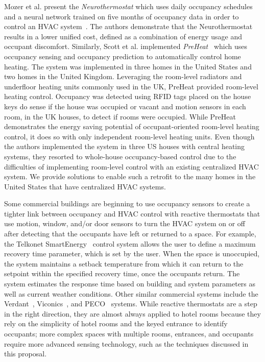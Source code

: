 Mozer et al. present the {\em Neurothermostat} which uses daily occupancy
schedules and a neural network trained on five months of occupancy data in order
to control an HVAC system~\cite{mozer1997neurothermostat}. The authors
demonstrate that the Neurothermostat results in a lower unified cost, defined as
a combination of energy usage and occupant discomfort. Similarly, Scott et
al. implemented {\em PreHeat}~\cite{scott2011preheat} which uses occupancy
sensing and occupancy prediction to automatically control home heating. The
system was implemented in three homes in the United States and two homes in the
United Kingdom. Leveraging the room-level radiators and underfloor heating units
commonly used in the UK, PreHeat provided room-level heating control. Occupancy
was detected using RFID tags placed on the house keys do sense if the house was
occupied or vacant and motion sensors in each room, in the UK houses, to detect
if rooms were occupied. While PreHeat demonstrates the energy saving potential
of occupant-oriented room-level heating control, it does so with only
independent room-level heating units. Even though the authors implemented the
system in three US houses with central heating systems, they resorted to
whole-house occupancy-based control due to the difficulties of implementing
room-level control with an existing centralized HVAC system. We provide
solutions to enable such a retrofit to the many homes in the United States that
have centralized HVAC systems.

Some commercial buildings are beginning to use occupancy sensors to create a
tighter link between occupancy and HVAC control with reactive thermostats that
use motion, window, and/or door sensors to turn the HVAC system on or off after
detecting that the occupants have left or returned to a space. For example, the
Telkonet SmartEnergy~\cite{telkonet} control system allows the user to define a
maximum recovery time parameter, which is set by the user. When the space is
unoccupied, the system maintains a setback temperature from which it can return
to the setpoint within the specified recovery time, once the occupants
return. The system estimates the response time based on building and system
parameters as well as current weather conditions. Other similar commercial
systems include the Verdant~\cite{prothermostats}, Viconics~\cite{vt7000}, and
PECO~\cite{peco} systems. While reactive thermostats are a step in the right
direction, they are almost always applied to hotel rooms because they rely on
the simplicity of hotel rooms and the keyed entrance to identify occupants; more
complex spaces with multiple rooms, entrances, and occupants require more
advanced sensing technology, such as the techniques discussed in this proposal.

